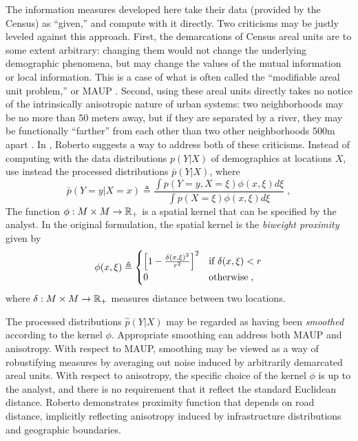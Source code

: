 \documentclass[english]{scrartcl}
\begin{document}
		The information measures developed here take their data (provided by the Census) as ``given,'' and compute with it directly. Two criticisms may be justly leveled against this approach. First, the demarcations of Census areal units are to some extent arbitrary: changing them would not change the underlying demographic phenomena, but may change the values of the mutual information or local information. This is a case of what is often called the ``modifiable areal unit problem,'' or MAUP \cite{Openshaw1981}. Second, using these areal units directly takes no notice of the intrinsically anisotropic nature of urban systems: two neighborhoods may be no more than 50 meters away, but if they are separated by a river, they may be functionally ``farther'' from each other than two other neighborhoods 500m apart \cite{Roberto2015}. In \cite{Roberto2015}, Roberto suggests a way to address both of these criticisms. Instead of computing with the data distributions $p(Y|X)$ of demographics at locations $X$, use instead the processed distributions $\bar{p}(Y|X)$, where 
		\begin{equation}
				\bar{p}(Y = y|X = x) \triangleq \frac{\int p(Y = y,X = \xi)\phi(x, \xi) d\xi}{\int p(X = \xi)\phi(x, \xi) d\xi}\;, \label{eq:divergence_smoother}
		\end{equation} 
		The function $\phi:M\times M \rightarrow \mathbb{R}_+$ is a spatial kernel that can be specified by the analyst. In the original formulation, the spatial kernel is the \emph{biweight proximity} given by 
		\begin{equation*}
			\phi(x, \xi) \triangleq 
			\begin{cases} 
				\left[1 - \frac{\delta(x, \xi)^2}{r^2} \right]^2 & \text{if } \delta(x, \xi) < r \\
				0 & \text{otherwise\;},
			\end{cases}
		\end{equation*}
		where $\delta:M\times M \rightarrow \mathbb{R}_+$ measures distance between two locations. 

		The processed distributions $\hat{p}(Y|X)$ may be regarded as having been \emph{smoothed} according to the kernel $\phi$. Appropriate smoothing can address both MAUP and anisotropy. With respect to MAUP, smoothing may be viewed as a way of robustifying measures by averaging out noise induced by arbitrarily demarcated areal units. With respect to anisotropy, the specific choice of the kernel $\phi$ is up to the analyst, and there is no requirement that it reflect the standard Euclidean distance. Roberto demonstrates proximity function that depends on road distance, implicitly reflecting anisotropy induced by infrastructure distributions and geographic boundaries. 
\end{document}
